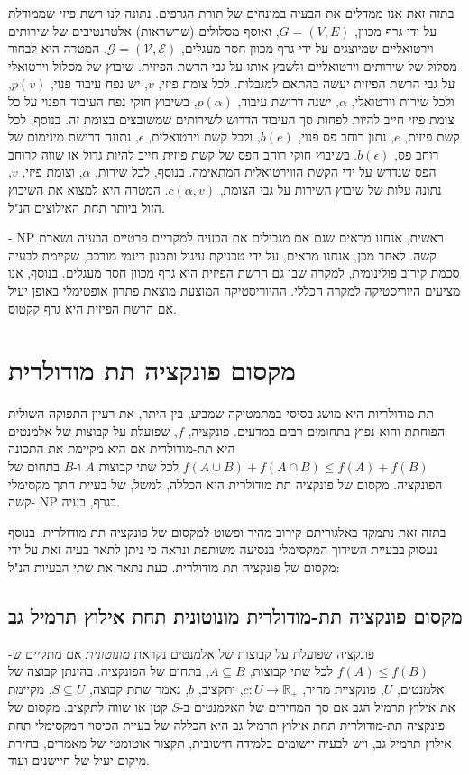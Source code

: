 \begin{hebrew}
בתזה זאת אנו ממדלים את הבעיה במונחים של תורת הגרפים.
נתונה לנו רשת פיזי שממודלת על ידי גרף מכוון,
$G=(V,E)$,
ואוסף מסלולים (שרשראות) אלטרנטיבים של שירותים וירטואליים שמיוצגים על ידי גרף מכוון חסר מעגלים,
$\mathcal{G} = (\mathcal{V}, \mathcal{E})$.
המטרה היא לבחור מסלול של שירותים וירטואליים ולשבץ אותו על גבי הרשת הפיזית.
שיבוץ של מסלול וירטואלי על גבי הרשת הפיזית יעשה בהתאם למגבלות.
לכל צומת פיזי,
$v$,
 יש נפח עיבוד פנוי,
$p(v)$,
ולכל שירות וירטואלי,
$\alpha$,
ישנה דרישת עיבוד,
$p(\alpha)$,
בשיבוץ חוקי נפח העיבוד הפנוי על כל צומת פיזי חייב להיות לפחות סך העיבוד הדרוש לשירותים שמשובצים בצומת זה.
בנוסף, לכל קשת פיזית,
$e$,
נתון רוחב פס פנוי,
$b(e)$,
ולכל קשת וירטואלית,
$\epsilon$,
נתונה דרישת מינימום של רוחב פס,
$b(\epsilon)$.
בשיבוץ חוקי רוחב הפס של קשת פיזית חייב להיות גדול או שווה לרוחב הפס שנדרש על ידי הקשת הווירטואלית  המתאימה.
בנוסף, לכל שירות,
$\alpha$,
וצומת פיזי,
$v$,
נתונה עלות של שיבוץ השירות על גבי הצומת,
$c(\alpha, v)$.
המטרה היא למצוא את השיבוץ הזול ביותר תחת האילוצים הנ"ל.

ראשית, אנחנו מראים שגם אם מגבילים את הבעיה למקריים פרטיים הבעיה נשארת
$\text{NP}$%
-קשה.
לאחר מכן, אנחנו מראים, על ידי טכניקת עיגול ותכנון דינמי מורכב, שקיימת לבעיה סכמת קירוב פולינומית, למקרה שבו גם הרשת הפיזית היא גרף מכוון חסר מעגלים.
בנוסף, אנו מציעים היוריסטיקה למקרה הכללי.
ההיוריסטיקה המוצעת  מוצאת פתרון אופטימלי באופן יעיל אם הרשת הפיזית היא גרף קקטוס.


\section*{\texthebrew{מקסום פונקציה תת מודולרית}}
תת-מודולריות היא מושג בסיסי במתמטיקה שמביע, בין היתר, את רעיון התפוקה השולית הפוחתת והוא נפוץ בתחומים רבים במדעים.
פונקציה,
$f$,
שפועלת על קבוצות של אלמנטים היא תת-מודולרית אם היא מקיימת את התכונה
$f(A \cup B) + f(A \cap B) \leq f(A) + f(B)$
לכל שתי קבוצות $A$ ו-$B$ בתחום של הפונקציה.
מקסום של פונקציה תת מודולרית היא הכללה, למשל, של בעיית חתך מקסימלי בגרף, בעיה
$\text{NP}$
-קשה.

בתזה זאת נתמקד באלגוריתם קירוב מהיר ופשוט למקסום של פונקציה תת מודולרית.
בנוסף נעסוק בבעיית השידוך המקסימלי בנסיעה משותפת ונראה כי ניתן לתאר בעיה זאת על ידי מקסום של פונקציה תת מודולרית.
כעת נתאר את שתי הבעיות הנ"ל:

\subsection*{\texthebrew{מקסום פונקציה תת-מודולרית מונוטונית תחת אילוץ תרמיל גב}}
פונקציה שפועלת על קבוצות  של אלמנטים נקראת
\emph{מונוטונית}
אם מתקיים ש-%
$f(A) \leq f(B)$
לכל שתי קבוצות,
$A \subseteq B$,
בתחום של הפונקציה.
בהינתן קבוצה של אלמנטים, $U$, פונקציית מחיר,
$c:U \to \mathbb{R_+}$,
ותקציב, $b$, נאמר שתת קבוצה,
$S \subseteq U$,
מקיימת את אילוץ תרמיל הגב אם סך המחירים של האלמנטים ב-$S$ קטן או שווה לתקציב.
מקסום של פונקציה תת-מודולרית תחת אילוץ תרמיל גב היא הכללה של בעיית הכיסוי המקסימלי תחת אילוץ תרמיל גב,
ויש לבעיה יישומים בלמידה חישובית, תקצור אוטומטי של מאמרים, בחירת מיקום יעיל של חיישנים ועוד.



\end{hebrew}
